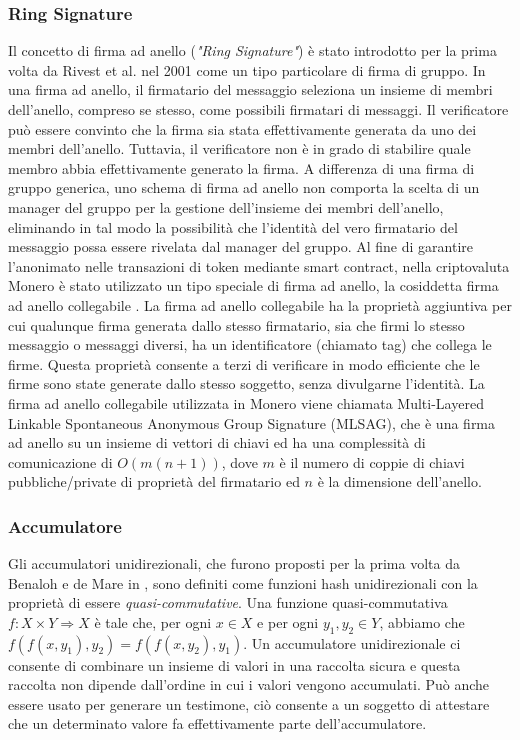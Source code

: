 \subsubsection{Ring Signature}
Il concetto di firma ad anello (\emph{"Ring Signature"}) è stato introdotto per la prima volta da Rivest et al. \cite{c27} nel 2001 come un tipo particolare di firma di gruppo. In una firma ad anello, il firmatario del messaggio seleziona un insieme di membri dell'anello, compreso se stesso, come possibili firmatari di messaggi. Il verificatore può essere convinto che la firma sia stata effettivamente generata da uno dei membri dell'anello.
Tuttavia, il verificatore non è in grado di stabilire quale membro abbia effettivamente generato la firma. A differenza di una firma di gruppo generica, uno schema di firma ad anello non comporta la scelta di un manager del gruppo per la gestione dell'insieme dei membri dell'anello, eliminando in tal modo la possibilità che l'identità del vero firmatario del messaggio possa essere rivelata dal manager del gruppo. Al fine di garantire l'anonimato nelle transazioni di token mediante smart contract, nella criptovaluta Monero è stato utilizzato un tipo speciale di firma ad anello, la cosiddetta firma ad anello collegabile \cite{c20}. La firma ad anello collegabile ha la proprietà aggiuntiva per cui qualunque firma generata dallo stesso firmatario, sia che firmi lo stesso messaggio o messaggi diversi, ha un identificatore (chiamato tag) che collega le firme. Questa proprietà consente a terzi di verificare in modo efficiente che le firme sono state generate dallo stesso soggetto, senza divulgarne l'identità. La firma ad anello collegabile utilizzata in Monero viene chiamata  Multi-Layered Linkable Spontaneous Anonymous Group Signature (MLSAG)\cite{c22}, che è una firma ad anello su un insieme di vettori di chiavi ed ha una complessità di comunicazione di $O(m(n + 1))$, dove $m$ è il numero di coppie di chiavi pubbliche/private di proprietà del firmatario ed $n$ è la dimensione dell'anello.

\subsubsection{Accumulatore}
Gli accumulatori unidirezionali, che furono proposti per la prima volta da Benaloh e de Mare in \cite{c2}, sono definiti come funzioni hash unidirezionali con la proprietà di essere \emph{quasi-commutative}. Una funzione quasi-commutativa $f: X \times Y \Rightarrow X$ è tale che, per ogni $x \in X$ e per ogni $y_1, y_2 \in Y$, abbiamo che $f(f(x, y_1), y_2) = f(f(x, y_2), y_1)$. Un accumulatore unidirezionale ci consente di combinare un insieme di valori in una raccolta sicura e questa raccolta non dipende dall'ordine in cui i valori vengono accumulati. Può anche essere usato per generare un testimone, ciò consente a un soggetto di attestare che un determinato valore fa effettivamente parte dell'accumulatore.

